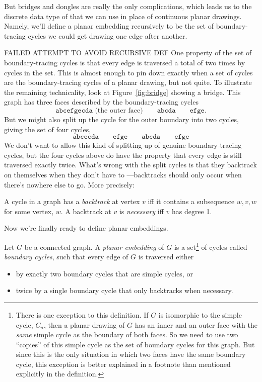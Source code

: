 But bridges and dongles are really the only complications, which leads
us to the discrete data type of  that we can use
in place of continuous planar drawings.  Namely, we'll define a planar
embedding recursively to be the set of boundary-tracing cycles we could
get drawing one edge after another.

\iffalse  FAILED ATTEMPT TO AVOID RECURSIVE DEF
One property of the set of boundary-tracing cycles is that every
edge is traversed a total of two times by cycles in the set.  This is
almost enough to pin down exactly when a set of cycles are the
boundary-tracing cycles of a planar drawing, but not quite.  To illustrate
the remaining technicality, look at Figure~\ref{fig:bridge} showing a
bridge.  This graph has three faces described by the boundary-tracing
cycles
\[
\mathtt{abcefgecda} \text{ (the outer face)} \qquad \mathtt{abcda}\qquad
\mathtt{efge}.
\]
But we might also split up the cycle for the outer boundary into two
cycles, giving the set of four cycles,
\[
\mathtt{abcecda}\qquad \mathtt{efge} \qquad \mathtt{abcda}\qquad
\mathtt{efge}
\]
We don't want to allow this kind of splitting up of genuine
boundary-tracing cycles, but the four cycles above do have the property
that every edge is still traversed exactly twice.  What's wrong with the
split cycles is that they backtrack on themselves when they don't have to
---backtracks should only occur when there's nowhere else to go.  More
precisely:
\begin{definition}
A cycle in a graph has a \emph{backtrack} at vertex $v$ iff it contains a
subsequence $w,v,w$ for some vertex, $w$.  A backtrack at $v$ is
\emph{necessary} iff $v$ has degree 1.
\end{definition}
Now we're finally ready to define planar embeddings.

Let $G$ be a connected graph.  A \emph{planar embedding} of $G$ is a
set\footnote{\label{C} There is one exception to this definition.  If $G$
is isomorphic to the simple cycle, $C_n$, then a planar drawing of $G$ has
an inner and an outer face with the \emph{same} simple cycle as the
boundary of both faces.  So we need to use two ``copies'' of this simple
cycle as the set of boundary cycles for this graph.  But since this is the
only situation in which two faces have the same boundary cycle, this
exception is better explained in a footnote than mentioned explicitly in
the definition.} of cycles called \emph{boundary cycles}, such that
every edge of $G$ is traversed either
\begin{itemize}
\item by exactly two boundary cycles that are simple cycles, or

\item twice by a single boundary cycle that only backtracks when
necessary.
\end{itemize}


